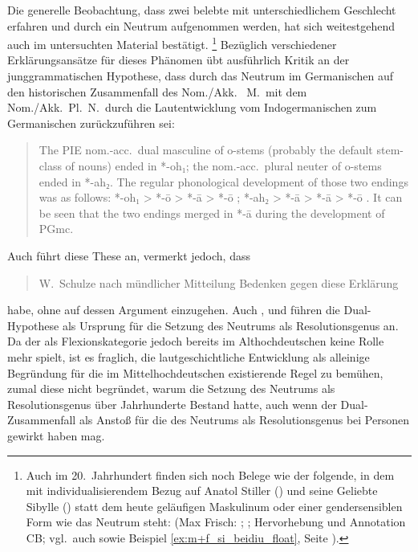 Die generelle Beobachtung, dass zwei belebte  mit
unterschiedlichem Geschlecht  erfahren und durch ein
Neutrum aufgenommen werden, hat sich weitestgehend auch im untersuchten
Material bestätigt.%
%
	\footnote{Auch im 20.~Jahrhundert finden sich noch
		Belege wie der folgende, in dem mit
		individualisierendem Bezug auf Anatol Stiller
		(\MascM) und seine Geliebte Sibylle (\FemF) statt dem heute geläufigen
		Maskulinum oder einer gendersensiblen Form wie 
		das Neutrum steht:  (Max Frisch:
		; \cite[332--333]{frisch:stiller}; Hervorhebung und
		Annotation CB; vgl.~auch \cite[188]{dal2014} sowie Beispiel
		\ref{ex:m+f_si_beidiu_float}, Seite \pageref{ex:m+f_si_beidiu_float}).
	}
%
Bezüglich verschiedener Erklärungs\-ansätze für dieses Phänomen übt
\citet[213--221]{askedal1973} ausführlich Kritik an der
junggrammatischen Hypothese, dass 
durch das Neutrum im Germanischen auf den
historischen Zusammenfall des Nom./Akk.\  M.\ mit dem
Nom./Akk.~Pl.~N.\ durch die Laut\-entwicklung vom
Indogermanischen zum Germanischen
zurückzuführen sei: \foreignblockcquote{english}[196]{ringe2017}{The PIE
nom.-acc.\ dual masculine of o-stems (probably the default
stem-class of nouns) ended in *-oh₁; the nom.-acc.\ plural neuter of o-stems
ended in *-ah₂. The regular phonological development of those two endings was
as follows: *-oh₁ > *-ō \textelp{} > *-ā > *-ō \textelp{}; *-ah₂ > *-ā
\textelp{} > *-ā > *-ō \textelp{}. It can be seen that the two endings merged
in *-ā during the development of PGmc.}

Auch \citeauthor{behaghel1928} führt diese These an, vermerkt
jedoch, dass \blockcquote[40]{behaghel1928}{W.~Schulze \textelp{} nach
mündlicher Mitteilung Bedenken gegen diese Erklärung} habe, ohne
auf dessen Argument einzugehen. Auch \citet[157]{hock2008},
\citet[196]{ringe2017} und \citet[104]{miller2019} führen die Dual-Hypothese
als Ursprung für die Setzung des Neutrums als Resolutionsgenus an. Da der  als Flexionskategorie jedoch bereits im
Althochdeutschen keine Rolle mehr spielt, ist es fraglich,
die lautgeschichtliche Entwicklung als alleinige Begründung für die im
Mittel\-hoch\-deutschen existierende Regel zu bemühen,
zumal diese nicht begründet, warum die Setzung des Neutrums als
Resolutionsgenus über Jahrhunderte Bestand hatte, auch
wenn der Dual-Zusammenfall als Anstoß für die  des
Neutrums als Resolutionsgenus bei Personen gewirkt haben mag.

